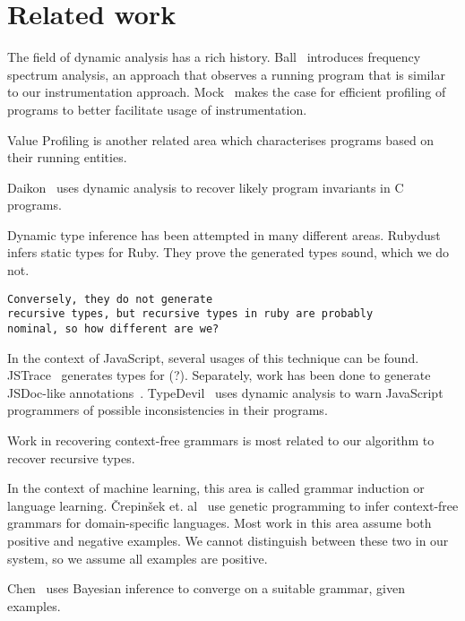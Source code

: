 \section{Related work}

The field of dynamic analysis has a rich history.
Ball~\cite{ball1999concept}
introduces frequency spectrum analysis,
an approach that observes a running program
that is similar to our instrumentation approach.
Mock~\cite{mock2003dynamic}
makes the case for efficient profiling of programs
to better facilitate usage of instrumentation.

Value Profiling is another related area which characterises
programs based on their running entities.

Daikon~\cite{ernst2001dynamically}
uses dynamic analysis to recover likely program invariants
in C programs.

Dynamic type inference has been attempted in many different
areas.
Rubydust~\cite{An10dynamicinference}
infers static types for Ruby. They prove the generated types
sound, which we do not. 
\begin{verbatim}
Conversely, they do not generate
recursive types, but recursive types in ruby are probably
nominal, so how different are we?
\end{verbatim}

In the context of JavaScript, several usages of this technique
can be found.
JSTrace~\cite{saftoiu2010jstrace}
generates types for (?).
Separately, work has been done to generate JSDoc-like annotations~\cite{odgaard2014}.
TypeDevil~\cite{pradel2015typedevil}
uses dynamic analysis to warn JavaScript programmers of possible inconsistencies
in their programs.

Work in recovering context-free grammars is most related to our algorithm
to recover recursive types.

In the context of machine learning, 
this area is called grammar induction or language learning.  %
{\v{C}}repin{\v{s}}ek et. al~\cite{vcrepinvsek2005inferring}
use genetic programming to infer context-free grammars
for domain-specific languages.
Most work in this area assume both positive and negative
examples. We cannot distinguish between these two in
our system, so we assume all examples are positive.

Chen~\cite{chen1995bayesian} uses Bayesian inference to converge
on a suitable grammar, given examples.

